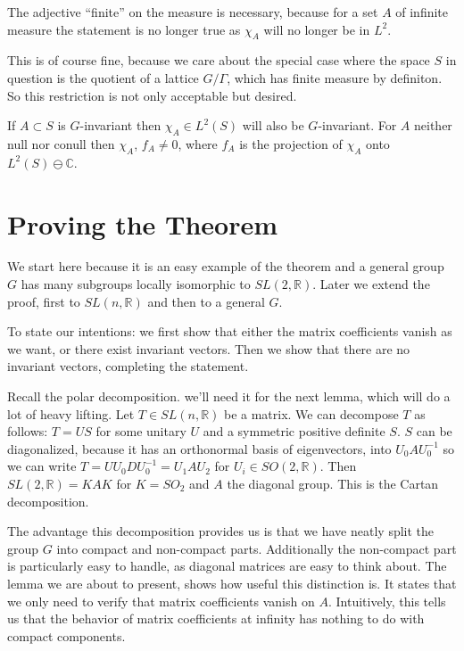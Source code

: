 \documentclass[
  12pt
]{article}
\theoremstyle{plain}
\newcommand{\slnr}{\ensuremath{SL(n, \mathbb{R})}\xspace}
\begin{document}
  The adjective ``finite'' on the measure is necessary, because for a set
  $A$ of infinite measure the statement is no longer true as $\chi_A$
  will no longer be in $L^2$.

  This is of course fine, because we care about the special case where the
  space $S$ in question is the quotient of a lattice $G/\Gamma$, which has
  finite measure by definiton. So this restriction is not only acceptable but
  desired.

  If $A\subset S$ is $G$-invariant then $\chi_A\in L^2(S)$ will also
  be $G$-invariant. 
  For $A$ neither null nor conull then
  $\chi_A$, $f_A \neq 0$, where $f_A$ is the projection of
  $\chi_A$ onto $L^2(S) \ominus \mathbb{C}$.




\hypertarget{proof-for-sl2r}{%
\section{Proving the Theorem}\label{proof-for-sl2r}}


  We start here because it is an easy example of the theorem and a general
  group $G$ has many subgroups locally isomorphic to
  $SL(2, \mathbb{R})$. Later we extend the proof, first to
  $SL(n, \mathbb{R})$ and then to a general $G$.

  To state our intentions: we first show that either the matrix
  coefficients vanish as we want, or there exist invariant vectors. Then
  we show that there are no invariant vectors, completing the statement.

  Recall the polar decomposition. we'll need it for the next lemma, which will do a lot of heavy lifting.
  Let $T \in \slnr$ be a matrix. We can decompose $T$ as follows:
  $T = US$ for some unitary $U$ and a symmetric positive definite $S$. $S$ can be
  diagonalized, because it has an orthonormal basis of eigenvectors, into $U_0 A U_0^{-1}$ so we can write
  $T = U U_0 D U_0^{-1} = U_1 A U_2$ for $U_i \in SO(2, \mathbb{R})$.
  Then $SL(2, \mathbb{R}) = KAK$ for $K = SO_2$ and $A$ the diagonal
  group. This is the Cartan decomposition.

  The advantage this decomposition provides us is that we have neatly split the group $G$ into compact and non-compact parts.
  Additionally the non-compact part is particularly easy to handle, as diagonal matrices are easy to think about.
  The lemma we are about to present, shows how useful this distinction is. It states that we only need to verify that matrix coefficients vanish on $A$.
  Intuitively, this tells us that the behavior of matrix coefficients at infinity has nothing to do with compact components.
\end{document}
